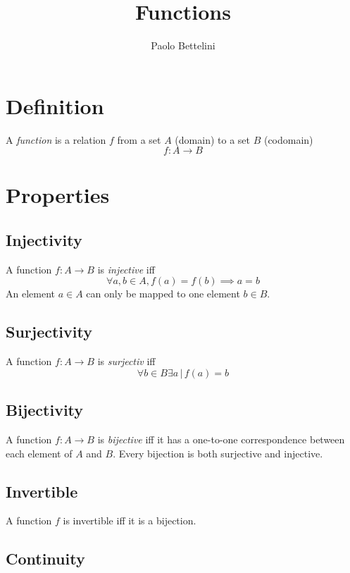\documentclass[a4paper]{article}
\title{Functions}
\author{Paolo Bettelini}
\date{}
\begin{document}
\maketitle
\tableofcontents
\pagebreak

\section{Definition}

A \textit{function} is a relation \(f\)
from a set \(A\) (domain) to a set \(B\) (codomain)
\[
    f: A \to B
\]

\section{Properties}

\subsection{Injectivity}

A function \(f:A\to B\) is \textit{injective} iff
\[
    \forall a,b \in A, f(a) = f(b) \implies a = b
\]
An element \(a\in A\) can only be mapped to one element \(b\in B\).

\subsection{Surjectivity}

A function \(f:A\to B\) is \textit{surjectiv} iff
\[
    \forall b \in B \exists a \,|\, f(a)=b
\]

\subsection{Bijectivity}

A function \(f:A\to B\) is \textit{bijective} iff
it has a one-to-one correspondence between each element of \(A\) and  \(B\).
Every bijection is both surjective and injective.

\subsection{Invertible}

A function \(f\) is invertible iff it is a bijection.

\subsection{Continuity}
\end{document}
